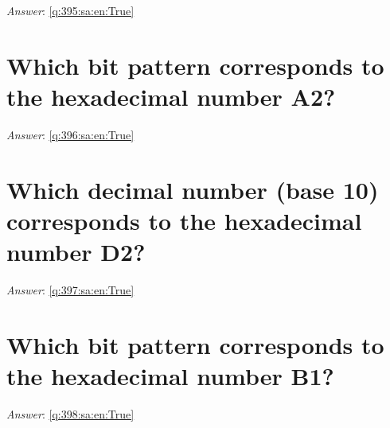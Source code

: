 \documentclass[a4paper,11pt,oneside]{book}
\begin{document}
\begin{sloppypar}
\vspace{2cm}

\noindent\makebox[\textwidth]{\hrulefill}

\vspace{1cm}

\textit{Answer}: \autoref{q:395:sa:en:True}



\section{Which bit pattern corresponds to the hexadecimal number A2?}

\label{q:396:sa:en:False}

\vspace{2cm}

\noindent\makebox[\textwidth]{\hrulefill}

\vspace{1cm}

\textit{Answer}: \autoref{q:396:sa:en:True}



\section{Which decimal number (base 10) corresponds to the hexadecimal number D2?}

\label{q:397:sa:en:False}

\vspace{2cm}

\noindent\makebox[\textwidth]{\hrulefill}

\vspace{1cm}

\textit{Answer}: \autoref{q:397:sa:en:True}



\section{Which bit pattern corresponds to the hexadecimal number B1?}

\label{q:398:sa:en:False}

\vspace{2cm}

\noindent\makebox[\textwidth]{\hrulefill}

\vspace{1cm}

\textit{Answer}: \autoref{q:398:sa:en:True}




\end{sloppypar}
\end{document}
